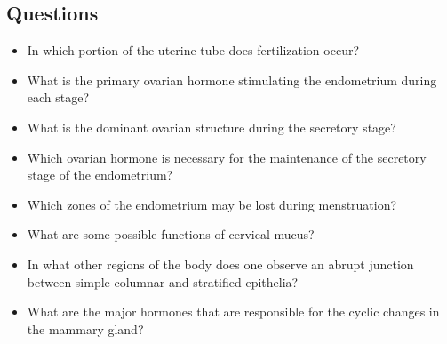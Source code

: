 \subsection{Questions}
\begin{itemize}\color{minor}
  \item In which portion of the uterine tube does fertilization occur?
  \basec{\begin{itemize}
    \item 
  \end{itemize}}
  
  \item What is the primary ovarian hormone stimulating the endometrium during each stage?
  \basec{\begin{itemize}
    \item 
  \end{itemize}}
  
  \item What is the dominant ovarian structure during the secretory stage?
  \basec{\begin{itemize}
    \item 
  \end{itemize}}

  \item Which ovarian hormone is necessary for the maintenance of the secretory stage of the endometrium?
  \basec{\begin{itemize}
    \item 
  \end{itemize}}
  
  \item Which zones of the endometrium may be lost during menstruation?
  \basec{\begin{itemize}
    \item 
  \end{itemize}}

  \item What are some possible functions of cervical mucus?
  \basec{\begin{itemize}
    \item 
  \end{itemize}}

  \item In what other regions of the body does one observe an abrupt junction between simple columnar and stratified epithelia?
  \basec{\begin{itemize}
    \item 
  \end{itemize}}

  \item  What are the major hormones that are responsible for the cyclic changes in the mammary gland?
  \basec{\begin{itemize}
    \item 
  \end{itemize}}
\end{itemize}

